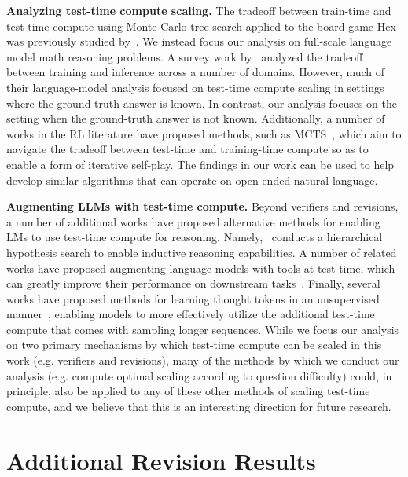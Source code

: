 \documentclass[11pt, letterpaper, logo]{googledeepmind}
\begin{document}
\textbf{Analyzing test-time compute scaling.} The tradeoff between train-time and test-time compute using Monte-Carlo tree search applied to the board game Hex was previously studied by~\citet{jones2021scalingscalinglawsboard}. We instead focus our analysis on full-scale language model math reasoning problems. A survey work by~\citet{epoch2023tradingoffcomputeintrainingandinference} analyzed the tradeoff between training and inference across a number of domains. However, much of their language-model analysis focused on test-time compute scaling in settings where the ground-truth answer is known. In contrast, our analysis focuses on the setting when the ground-truth answer is not known. Additionally, a number of works in the RL literature have proposed methods, such as MCTS~\citep{kocsis2006bandit}, which aim to navigate the tradeoff between test-time and training-time compute so as to enable a form of iterative self-play. The findings in our work can be used to help develop similar algorithms that can operate on open-ended natural language.

\textbf{Augmenting LLMs with test-time compute.} Beyond verifiers and revisions, a number of additional works have proposed alternative methods for enabling LMs to use test-time compute for reasoning. Namely,~\citet{wang2024hypothesissearchinductivereasoning} conducts a hierarchical hypothesis search to enable inductive reasoning capabilities. A number of related works have proposed augmenting language models with tools at test-time, which can greatly improve their performance on downstream tasks~\citep{gao2023palprogramaidedlanguagemodels,qin2023toolllmfacilitatinglargelanguage,qu2024toollearninglargelanguage}.
Finally, several works have proposed methods for learning thought tokens in an unsupervised manner~\citep{zelikman2024quietstarlanguagemodelsteach,goyal2024thinkspeaktraininglanguage}, enabling models to more effectively utilize the additional test-time compute that comes with sampling longer sequences. While we focus our analysis on two primary mechanisms by which test-time compute can be scaled in this work (e.g. verifiers and revisions), many of the methods by which we conduct our analysis (e.g. compute optimal scaling according to question difficulty) could, in principle, also be applied to any of these other methods of scaling test-time compute, and we believe that this is an interesting direction for future research.

\section{Additional Revision Results}
\label{app:additional_revision}
\end{document}
